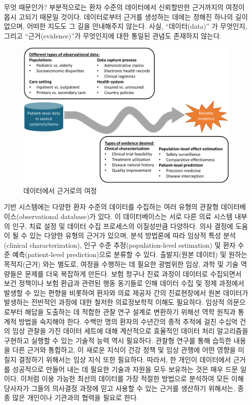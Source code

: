 \documentclass[11pt]{book}
\theoremstyle{definition}
\theoremstyle{definition}
\theoremstyle{definition}
\theoremstyle{remark}
\begin{document}
무엇 때문인가? 부분적으로는 환자 수준의 데이터에서 신뢰할만한 근거까지의
여정이 몹시 고되기 때문일 것이다. 데이터로부터 근거를 생성하는 데에는
정해진 하나의 길이 없으며, 어떠한 지도도 그 길을 안내해주지 않는다.
사실, ``데이터(data)'' 가 무엇인지, 그리고 ``근거(evidence)''가
무엇인지에 대한 통일된 관념도 존재하지 않는다.

\begin{figure}

{\centering \includegraphics[width=1\linewidth]{images/OhdsiCommunity/datajourney} 

}

\caption{데이터에서 근거로의 여정}\label{fig:datajourney}
\end{figure}

기반 시스템에는 다양한 환자 수준의 데이터를 수집하는 여러 유형의 관찰형
데이터베이스(observational database)가 있다. 이 데이터베이스는 서로 다른
의료 시스템 내부의 인구, 치료 설정 및 데이터 수집 프로세스의 이질성만큼
다양하다. 의사 결정에 도움이 될 수 있는 다양한 유형의 근거가 있으며,
분석 방법론에 따라 임상적 특성 분석(clinical characterization), 인구
수준 추정(population-level estimation) 및 환자 수준 예측(patient-level
prediction)으로 분류할 수 있다. 출발지(원본 데이터) 및 원하는
목적지(근거) 와는 별도로, 여정을 수행하는 데 필요한 광범위한 임상, 과학
및 기술 역량들은 문제를 더욱 복잡하게 만든다. 보험 청구나 진료 과정이
데이터로 수집되면서 보건 정책이나 보험 환급과 관련된 행동 동기들로 인해
데이터 수집 및 정제 과정에서 발생할 수 있는 편향을 비롯하여 환자와 의료
제공자 간의 진료현장에서 원본 데이터가 발생하는 전반적인 과정에 대한
철저한 의료정보학적 이해도 필요하다. 임상적 의문으로부터 해답을 도출하는
데 적합한 관찰 연구 설계로 변환하기 위해선 역학 원칙과 통계적 방법을
숙지해야 한다. 수백만 명의 환자의 수년간의 종적 추적에 걸친 수십억 건의
임상 관찰을 가진 데이터 세트에 대해 계산적으로 효율적인 데이터 처리
알고리즘을 구현하고 실행할 수 있는 기술적 능력 역시 필요하다. 관찰형
연구를 통해 습득한 내용을 다른 근거와 통합하고, 이 새로운 지식이 건강
정책 및 임상 관행에 어떤 영향을 미칠지 결정하기 위해서는 임상 지식 또한
필요하다. 따라서, 한 개인이 데이터에서 근거를 성공적으로 만들어 내는 데
필요한 기술과 자원을 모두 보유하는 것은 매우 드문 일이다. 이처럼 이용
가능한 최선의 데이터를 가장 적절한 방법으로 분석하여 모든 이해당사자가
그들의 의사결정 과정에 믿고 사용할 수 있는 근거를 생산하기 위해서는,
종종 많은 개인이나 기관과의 협력을 필요로 한다.
\end{document}

